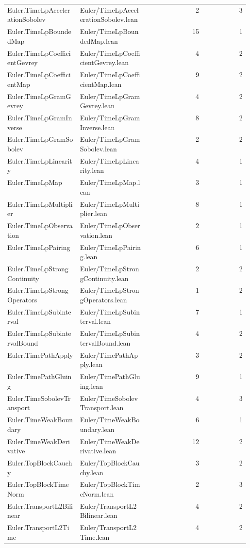 \begin{longtable}{p{0.30\linewidth}p{0.28\linewidth}rr}
Euler.TimeLpAccelerationSobolev & Euler/TimeLpAccelerationSobolev.lean & 2 & 3\\
Euler.TimeLpBoundedMap & Euler/TimeLpBoundedMap.lean & 15 & 1\\
Euler.TimeLpCoefficientGevrey & Euler/TimeLpCoefficientGevrey.lean & 4 & 2\\
Euler.TimeLpCoefficientMap & Euler/TimeLpCoefficientMap.lean & 9 & 2\\
Euler.TimeLpGramGevrey & Euler/TimeLpGramGevrey.lean & 4 & 2\\
Euler.TimeLpGramInverse & Euler/TimeLpGramInverse.lean & 8 & 2\\
Euler.TimeLpGramSobolev & Euler/TimeLpGramSobolev.lean & 2 & 2\\
Euler.TimeLpLinearity & Euler/TimeLpLinearity.lean & 4 & 1\\
Euler.TimeLpMap & Euler/TimeLpMap.lean & 3 & 1\\
Euler.TimeLpMultiplier & Euler/TimeLpMultiplier.lean & 8 & 1\\
Euler.TimeLpObservation & Euler/TimeLpObservation.lean & 2 & 1\\
Euler.TimeLpPairing & Euler/TimeLpPairing.lean & 6 & 1\\
Euler.TimeLpStrongContinuity & Euler/TimeLpStrongContinuity.lean & 2 & 2\\
Euler.TimeLpStrongOperators & Euler/TimeLpStrongOperators.lean & 1 & 2\\
Euler.TimeLpSubinterval & Euler/TimeLpSubinterval.lean & 7 & 1\\
Euler.TimeLpSubintervalBound & Euler/TimeLpSubintervalBound.lean & 4 & 2\\
Euler.TimePathApply & Euler/TimePathApply.lean & 3 & 2\\
Euler.TimePathGluing & Euler/TimePathGluing.lean & 9 & 1\\
Euler.TimeSobolevTransport & Euler/TimeSobolevTransport.lean & 4 & 3\\
Euler.TimeWeakBoundary & Euler/TimeWeakBoundary.lean & 6 & 1\\
Euler.TimeWeakDerivative & Euler/TimeWeakDerivative.lean & 12 & 2\\
Euler.TopBlockCauchy & Euler/TopBlockCauchy.lean & 3 & 2\\
Euler.TopBlockTimeNorm & Euler/TopBlockTimeNorm.lean & 2 & 3\\
Euler.TransportL2Bilinear & Euler/TransportL2Bilinear.lean & 4 & 2\\
Euler.TransportL2Time & Euler/TransportL2Time.lean & 4 & 2\\

\end{longtable}
